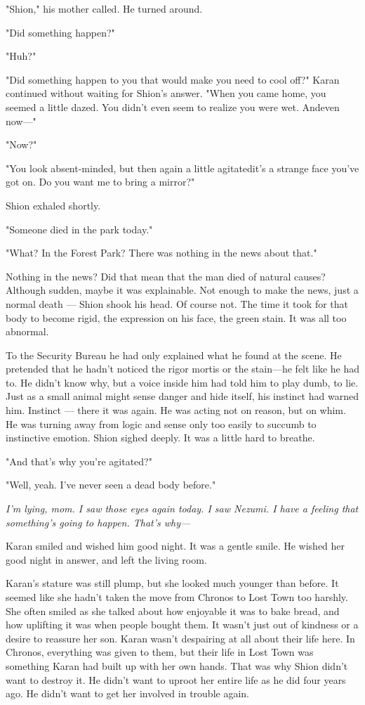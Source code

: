 "Shion," his mother called. He turned around.

"Did something happen?"

"Huh?"

"Did something happen to you that would make you need to cool off?"
Karan continued without waiting for Shion's answer. "When you came home,
you seemed a little dazed. You didn't even seem to realize you were wet.
And\el even now---"

"Now?"

"You look absent-minded, but then again a little agitated\el it's a
strange face you've got on. Do you want me to bring a mirror?"

Shion exhaled shortly.

"Someone died in the park today."

"What? In the Forest Park? There was nothing in the news about that."

Nothing in the news? Did that mean that the man died of natural causes?
Although sudden, maybe it was explainable. Not enough to make the news,
just a normal death --- Shion shook his head. Of course not. The time it
took for that body to become rigid, the expression on his face, the
green stain. It was all too abnormal.

To the Security Bureau he had only explained what he found at the scene.
He pretended that he hadn't noticed the rigor mortis or the stain---he
felt like he had to. He didn't know why, but a voice inside him had told
him to play dumb, to lie. Just as a small animal might sense danger and
hide itself, his instinct had warned him. Instinct --- there it was again.
He was acting not on reason, but on whim. He was turning away from logic
and sense only too easily to succumb to instinctive emotion. Shion
sighed deeply. It was a little hard to breathe.

"And that's why you're agitated?"

"Well, yeah. I've never seen a dead body before."

\emph{I'm lying, mom. I saw those eyes again today. I saw Nezumi. I have a
feeling that something's going to happen. That's why---}

Karan smiled and wished him good night. It was a gentle smile. He wished
her good night in answer, and left the living room.

Karan's stature was still plump, but she looked much younger than
before. It seemed like she hadn't taken the move from Chronos to Lost
Town too harshly. She often smiled as she talked about how enjoyable it
was to bake bread, and how uplifting it was when people bought them. It
wasn't just out of kindness or a desire to reassure her son. Karan
wasn't despairing at all about their life here. In Chronos, everything
was given to them, but their life in Lost Town was something Karan had
built up with her own hands. That was why Shion didn't want to destroy
it. He didn't want to uproot her entire life as he did four years ago.
He didn't want to get her involved in trouble again.

